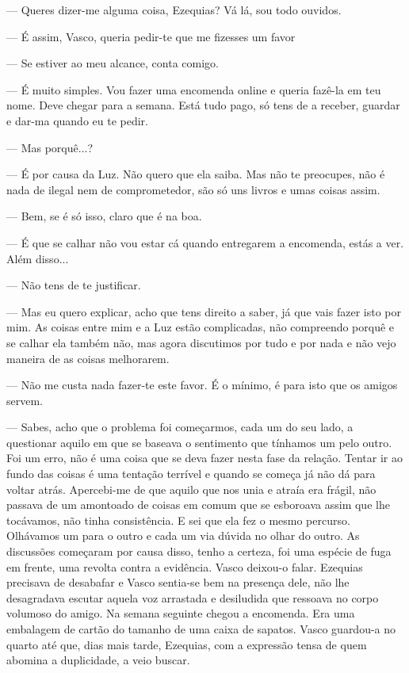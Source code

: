 --- Queres dizer-me alguma coisa, Ezequias? Vá lá, sou todo ouvidos.

--- É assim, Vasco, queria pedir-te que me fizesses um favor

--- Se estiver ao meu alcance, conta comigo.

--- É muito simples. Vou fazer uma encomenda online e
queria fazê-la em teu nome. Deve chegar para a semana. Está
tudo pago, só tens de a receber, guardar e dar-ma quando eu
te pedir.

--- Mas porquê...?

--- É por causa da Luz. Não quero que ela saiba. Mas não
te preocupes, não é nada de ilegal nem de comprometedor, são
só uns livros e umas coisas assim.

--- Bem, se é só isso, claro que é na boa.

--- É que se calhar não vou estar cá quando entregarem a
encomenda, estás a ver. Além disso...

--- Não tens de te justificar.

--- Mas eu quero explicar, acho que tens direito a saber, já
que vais fazer isto por mim. As coisas entre mim e a Luz estão
complicadas, não compreendo porquê e se calhar ela também
não, mas agora discutimos por tudo e por nada e não vejo
maneira de as coisas melhorarem.

--- Não me custa nada fazer-te este favor. É o mínimo, é
para isto que os amigos servem.

--- Sabes, acho que o problema foi começarmos, cada um
do seu lado, a questionar aquilo em que se baseava o sentimento
que tínhamos um pelo outro. Foi um erro, não é uma coisa que se
deva fazer nesta fase da relação. Tentar ir ao fundo das
coisas é uma tentação terrível e quando se começa já não dá para voltar
atrás. Apercebi-me de que aquilo que nos unia e atraía era frágil, não
passava de um amontoado de coisas em comum que se esboroava assim que
lhe tocávamos, não tinha consistência. E sei que ela fez o mesmo
percurso. Olhávamos um para o outro e cada um via dúvida no olhar do
outro. As discussões começaram por causa disso, tenho a certeza, foi uma
espécie de fuga em frente, uma revolta contra a evidência. Vasco
deixou-o falar. Ezequias precisava de desabafar e Vasco sentia-se bem na
presença dele, não lhe desagradava escutar aquela voz arrastada e
desiludida que ressoava no corpo volumoso do amigo. Na semana seguinte
chegou a encomenda. Era uma embalagem de cartão do tamanho de uma
caixa de sapatos. Vasco guardou-a no quarto até que, dias mais tarde,
Ezequias, com a expressão tensa de quem abomina a duplicidade, a veio buscar.

